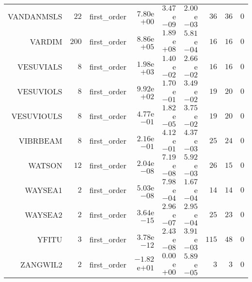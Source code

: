 \begin{longtable}{rrrrrrrrr}
VANDANMSLS & \(    22\) & first\_order & \( 7.80\)e\(+00\) & \( 3.47\)e\(-09\) & \( 2.00\)e\(-03\) & \(    36\) & \(    36\) & \(     0\) \\
VARDIM & \(   200\) & first\_order & \( 8.86\)e\(+05\) & \( 1.89\)e\(+08\) & \( 5.81\)e\(-04\) & \(    16\) & \(    16\) & \(     0\) \\
VESUVIALS & \(     8\) & first\_order & \( 1.98\)e\(+03\) & \( 1.40\)e\(-02\) & \( 2.66\)e\(-02\) & \(    16\) & \(    16\) & \(     0\) \\
VESUVIOLS & \(     8\) & first\_order & \( 9.92\)e\(+02\) & \( 1.70\)e\(-01\) & \( 3.49\)e\(-02\) & \(    19\) & \(    20\) & \(     0\) \\
VESUVIOULS & \(     8\) & first\_order & \( 4.77\)e\(-01\) & \( 1.82\)e\(-05\) & \( 3.75\)e\(-02\) & \(    19\) & \(    20\) & \(     0\) \\
VIBRBEAM & \(     8\) & first\_order & \( 2.16\)e\(-01\) & \( 4.12\)e\(-01\) & \( 4.37\)e\(-03\) & \(    25\) & \(    24\) & \(     0\) \\
WATSON & \(    12\) & first\_order & \( 2.04\)e\(-08\) & \( 7.19\)e\(-08\) & \( 5.92\)e\(-03\) & \(    26\) & \(    15\) & \(     0\) \\
WAYSEA1 & \(     2\) & first\_order & \( 5.03\)e\(-08\) & \( 7.98\)e\(-04\) & \( 1.67\)e\(-04\) & \(    14\) & \(    14\) & \(     0\) \\
WAYSEA2 & \(     2\) & first\_order & \( 3.64\)e\(-15\) & \( 2.96\)e\(-07\) & \( 2.95\)e\(-04\) & \(    25\) & \(    23\) & \(     0\) \\
YFITU & \(     3\) & first\_order & \( 3.78\)e\(-12\) & \( 2.43\)e\(-08\) & \( 3.91\)e\(-03\) & \(   115\) & \(    48\) & \(     0\) \\
ZANGWIL2 & \(     2\) & first\_order & \(-1.82\)e\(+01\) & \( 0.00\)e\(+00\) & \( 5.89\)e\(-05\) & \(     3\) & \(     3\) & \(     0\) \\\hline
\end{longtable}
